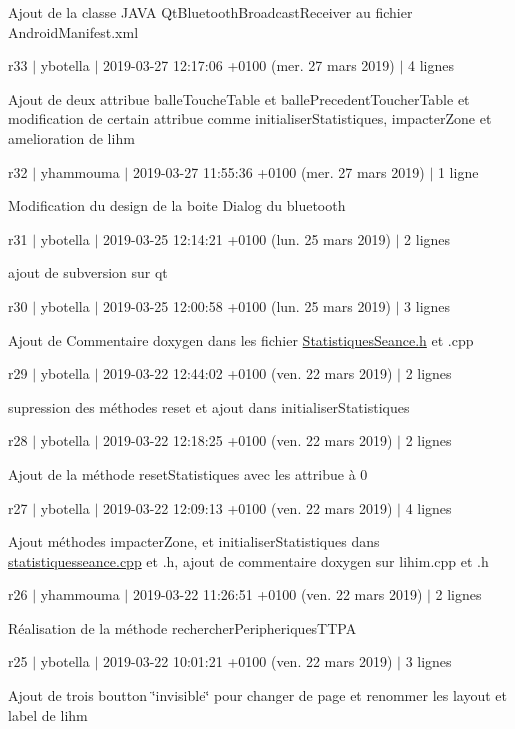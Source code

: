 Ajout de la classe J\+A\+VA Qt\+Bluetooth\+Broadcast\+Receiver au fichier Android\+Manifest.\+xml

r33 $\vert$ ybotella $\vert$ 2019-\/03-\/27 12\+:17\+:06 +0100 (mer. 27 mars 2019) $\vert$ 4 lignes

Ajout de deux attribue balle\+Touche\+Table et balle\+Precedent\+Toucher\+Table et modification de certain attribue comme initialiser\+Statistiques, impacter\+Zone et amelioration de l\textquotesingle{}ihm

r32 $\vert$ yhammouma $\vert$ 2019-\/03-\/27 11\+:55\+:36 +0100 (mer. 27 mars 2019) $\vert$ 1 ligne

Modification du design de la boite Dialog du bluetooth

r31 $\vert$ ybotella $\vert$ 2019-\/03-\/25 12\+:14\+:21 +0100 (lun. 25 mars 2019) $\vert$ 2 lignes

ajout de subversion sur qt

r30 $\vert$ ybotella $\vert$ 2019-\/03-\/25 12\+:00\+:58 +0100 (lun. 25 mars 2019) $\vert$ 3 lignes

Ajout de Commentaire doxygen dans les fichier \hyperlink{statistiquesseance_8h}{Statistiques\+Seance.\+h} et .cpp

r29 $\vert$ ybotella $\vert$ 2019-\/03-\/22 12\+:44\+:02 +0100 (ven. 22 mars 2019) $\vert$ 2 lignes

supression des méthodes reset et ajout dans initialiser\+Statistiques

r28 $\vert$ ybotella $\vert$ 2019-\/03-\/22 12\+:18\+:25 +0100 (ven. 22 mars 2019) $\vert$ 2 lignes

Ajout de la méthode reset\+Statistiques avec les attribue à 0

r27 $\vert$ ybotella $\vert$ 2019-\/03-\/22 12\+:09\+:13 +0100 (ven. 22 mars 2019) $\vert$ 4 lignes

Ajout méthodes impacter\+Zone, et initialiser\+Statistiques dans \hyperlink{statistiquesseance_8cpp}{statistiquesseance.\+cpp} et .h, ajout de commentaire doxygen sur l\textquotesingle{}ihim.\+cpp et .h

r26 $\vert$ yhammouma $\vert$ 2019-\/03-\/22 11\+:26\+:51 +0100 (ven. 22 mars 2019) $\vert$ 2 lignes

Réalisation de la méthode rechercher\+Peripheriques\+T\+T\+PA

r25 $\vert$ ybotella $\vert$ 2019-\/03-\/22 10\+:01\+:21 +0100 (ven. 22 mars 2019) $\vert$ 3 lignes

Ajout de trois boutton \char`\"{}invisible\char`\"{} pour changer de page et renommer les layout et label de l\textquotesingle{}ihm

